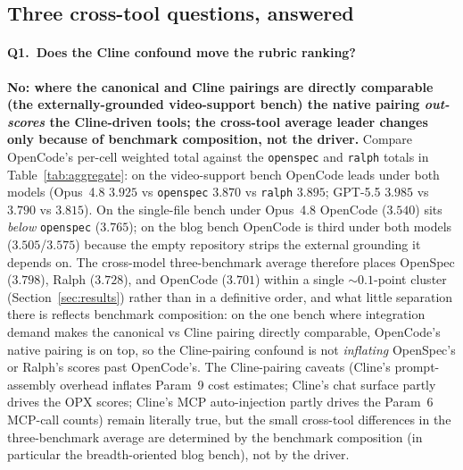 \subsection{Three cross-tool questions, answered}

\paragraph{Q1.\ Does the Cline confound move the rubric ranking?}
\textbf{No: where the canonical and Cline pairings are directly
comparable (the externally-grounded video-support bench) the native pairing
\emph{out-scores} the Cline-driven tools; the cross-tool average
leader changes only because of benchmark composition, not the driver.}
Compare OpenCode's per-cell weighted total against the
\texttt{openspec} and \texttt{ralph} totals in
Table~\ref{tab:aggregate}: on the video-support bench OpenCode leads under
both models (Opus~4.8 $3.925$ vs \texttt{openspec} $3.870$ vs
\texttt{ralph} $3.895$; GPT-5.5 $3.985$ vs $3.790$ vs $3.815$). On the
single-file bench under Opus~4.8 OpenCode ($3.540$) sits \emph{below}
\texttt{openspec} ($3.765$); on the blog bench OpenCode is
third under both models ($3.505$/$3.575$) because the empty repository
strips the external grounding it depends on. The cross-model
three-benchmark average therefore places OpenSpec ($3.798$), Ralph
($3.728$), and OpenCode ($3.701$) within a single ${\sim}0.1$-point
cluster (Section~\ref{sec:results}) rather than in a definitive order,
and what little separation there is reflects benchmark composition: on
the one bench where integration demand makes the canonical vs Cline
pairing directly comparable, OpenCode's native pairing is on top, so the
Cline-pairing confound is not \emph{inflating} OpenSpec's or Ralph's
scores past OpenCode's. The
Cline-pairing caveats (Cline's prompt-assembly overhead inflates
Param~9 cost estimates; Cline's chat surface partly drives the OPX
scores; Cline's MCP auto-injection partly drives the Param~6 MCP-call
counts) remain literally true, but the small cross-tool differences in
the three-benchmark average are determined by the benchmark composition
(in particular the breadth-oriented blog bench), not by the driver.

